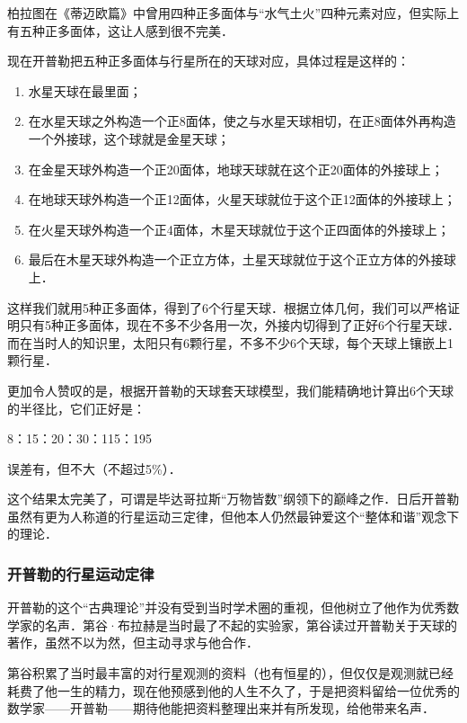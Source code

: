 柏拉图在《蒂迈欧篇》中曾用四种正多面体与“水气土火”四种元素对应，但实际上有五种正多面体，这让人感到很不完美．

现在开普勒把五种正多面体与行星所在的天球对应，具体过程是这样的：

\begin{enumerate}
\item 水星天球在最里面；

\item 在水星天球之外构造一个正8面体，使之与水星天球相切，在正8面体外再构造一个外接球，这个球就是金星天球；

\item 在金星天球外构造一个正20面体，地球天球就在这个正20面体的外接球上；

\item 在地球天球外构造一个正12面体，火星天球就位于这个正12面体的外接球上；

\item 在火星天球外构造一个正4面体，木星天球就位于这个正四面体的外接球上；

\item 最后在木星天球外构造一个正立方体，土星天球就位于这个正立方体的外接球上．
\end{enumerate}

这样我们就用5种正多面体，得到了6个行星天球．根据立体几何，我们可以严格证明只有5种正多面体，现在不多不少各用一次，外接内切得到了正好6个行星天球．而在当时人的知识里，太阳只有6颗行星，不多不少6个天球，每个天球上镶嵌上1颗行星．

更加令人赞叹的是，根据开普勒的天球套天球模型，我们能精确地计算出6个天球的半径比，它们正好是：

8：15：20：30：115：195

误差有，但不大（不超过5\%）．

这个结果太完美了，可谓是毕达哥拉斯“万物皆数”纲领下的巅峰之作．日后开普勒虽然有更为人称道的行星运动三定律，但他本人仍然最钟爱这个“整体和谐”观念下的理论．


\subsubsection{开普勒的行星运动定律}

开普勒的这个“古典理论”并没有受到当时学术圈的重视，但他树立了他作为优秀数学家的名声．第谷·布拉赫是当时最了不起的实验家，第谷读过开普勒关于天球的著作，虽然不以为然，但主动寻求与他合作．

第谷积累了当时最丰富的对行星观测的资料（也有恒星的），但仅仅是观测就已经耗费了他一生的精力，现在他预感到他的人生不久了，于是把资料留给一位优秀的数学家——开普勒——期待他能把资料整理出来并有所发现，给他带来名声．

